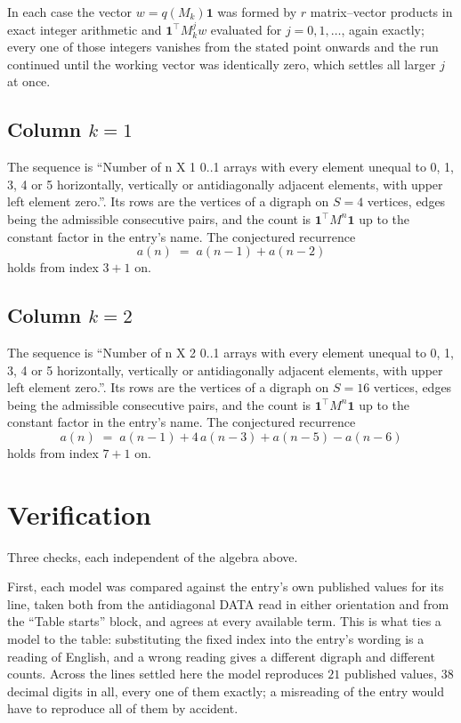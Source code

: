 \documentclass[11pt,a4paper]{article}
\theoremstyle{plain}
\theoremstyle{definition}
\begin{document}
In each case the vector $w=q(M_k)\mathbf{1}$ was formed by $r$ matrix--vector products in
exact integer arithmetic and $\mathbf{1}^{\!\top}M_k^{j}w$ evaluated for $j=0,1,\dots$,
again exactly; every one of those integers vanishes from the stated point onwards and the run
continued until the working vector was identically zero, which settles all larger $j$ at once.

\subsection*{Column $k$$=1$}
The sequence is ``Number of n X 1 0..1 arrays with every element unequal to 0, 1, 3, 4 or 5 horizontally, vertically or antidiagonally adjacent elements, with upper left element zero.''. Its rows are the vertices of a digraph on
$S=4$ vertices, edges being the admissible consecutive pairs, and the count is
$\mathbf{1}^{\!\top}M^{n}\mathbf{1}$ up to the constant factor in the entry's name.
The conjectured recurrence
\[
a(n)\;=\;a(n-1) + a(n-2)
\]
holds from index $3+1$ on.

\subsection*{Column $k$$=2$}
The sequence is ``Number of n X 2 0..1 arrays with every element unequal to 0, 1, 3, 4 or 5 horizontally, vertically or antidiagonally adjacent elements, with upper left element zero.''. Its rows are the vertices of a digraph on
$S=16$ vertices, edges being the admissible consecutive pairs, and the count is
$\mathbf{1}^{\!\top}M^{n}\mathbf{1}$ up to the constant factor in the entry's name.
The conjectured recurrence
\[
a(n)\;=\;a(n-1) + 4\,a(n-3) + a(n-5) - a(n-6)
\]
holds from index $7+1$ on.

\section{Verification}

Three checks, each independent of the algebra above.

First, each model was compared against the entry's own published values for its line, taken
both from the antidiagonal DATA read in either orientation and from the ``Table starts''
block, and agrees at every available term. This is what ties a model to the table:
substituting the fixed index into the entry's wording is a reading of English, and a wrong
reading gives a different digraph and different counts. Across the lines settled here the
model reproduces $21$ published values, $38$ decimal digits in all, every one of
them exactly; a misreading of the entry would have to reproduce all of them by accident.
\end{document}
